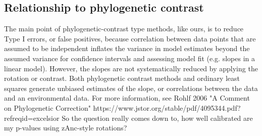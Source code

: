 \documentclass[12pt]{report}
\begin{document}
\subsection{Relationship to phylogenetic contrast}
The main point of phylogenetic-contrast type methods, like ours, is to reduce Type I errors, or false positives, because correlation between data points that are assumed to be independent inflates the variance in model estimates beyond the assumed variance for confidence intervals and assessing model fit (e.g. slopes in a linear model). However, the slopes are not systematically reduced by applying the rotation or contrast. Both phylogenetic contrast methods and ordinary least squares generate unbiased estimates of the slope, or correlations between the data and an environmental data. For more information, see Rohlf 2006 "A Comment on Phylogenetic Correction" https://www.jstor.org/stable/pdf/4095344.pdf?refreqid=excelsior%
So the question really comes down to, how well calibrated are my p-values using zAnc-style rotations?
\end{document}
